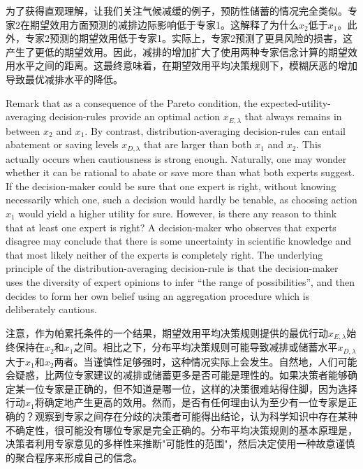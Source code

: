 \documentclass[12pt,a4paper]{article}
\newenvironment{original}
  {\par\noindent\ignorespaces}
  {\par}
\newenvironment{translation}
  {\par\noindent{\color{transblue}\ignorespaces}}
  {\par\medskip}
\begin{document}
\begin{translation}
为了获得直观理解，让我们关注气候减缓的例子，预防性储蓄的情况完全类似。专家2在期望效用方面预测的减排边际影响低于专家1。这解释了为什么$x_{2}$低于$x_{1}$。此外，专家2预测的期望效用低于专家1。实际上，专家2预测了更具风险的损害，这产生了更低的期望效用。因此，减排的增加扩大了使用两种专家信念计算的期望效用水平之间的距离。这最终意味着，在期望效用平均决策规则下，模糊厌恶的增加导致最优减排水平的降低。
\end{translation}

\begin{original}
Remark that as a consequence of the Pareto condition, the expected-utility-averaging decision-rules provide an optimal action $x_{E,\lambda}$ that always remains in between $x_{2}$ and $x_{1}$. By contrast, distribution-averaging decision-rules can entail abatement or saving levels $x_{D,\lambda}$ that are larger than both $x_{1}$ and $x_{2}$. This actually occurs when cautiousness is strong enough. Naturally, one may wonder whether it can be rational to abate or save more than what both experts suggest. If the decision-maker could be sure that one expert is right, without knowing necessarily which one, such a decision would hardly be tenable, as choosing action $x_{1}$ would yield a higher utility for sure. However, is there any reason to think that at least one expert is right? A decision-maker who observes that experts disagree may conclude that there is some uncertainty in scientific knowledge and that most likely neither of the experts is completely right. The underlying principle of the distribution-averaging decision-rule is that the decision-maker uses the diversity of expert opinions to infer ``the range of possibilities'', and then decides to form her own belief using an aggregation procedure which is deliberately cautious.
\end{original}

\begin{translation}
注意，作为帕累托条件的一个结果，期望效用平均决策规则提供的最优行动$x_{E,\lambda}$始终保持在$x_{2}$和$x_{1}$之间。相比之下，分布平均决策规则可能导致减排或储蓄水平$x_{D,\lambda}$大于$x_{1}$和$x_{2}$两者。当谨慎性足够强时，这种情况实际上会发生。自然地，人们可能会疑惑，比两位专家建议的减排或储蓄更多是否可能是理性的。如果决策者能够确定某一位专家是正确的，但不知道是哪一位，这样的决策很难站得住脚，因为选择行动$x_{1}$将确定地产生更高的效用。然而，是否有任何理由认为至少有一位专家是正确的？观察到专家之间存在分歧的决策者可能得出结论，认为科学知识中存在某种不确定性，很可能没有哪位专家是完全正确的。分布平均决策规则的基本原理是，决策者利用专家意见的多样性来推断"可能性的范围"，然后决定使用一种故意谨慎的聚合程序来形成自己的信念。
\end{translation}
\end{document}
